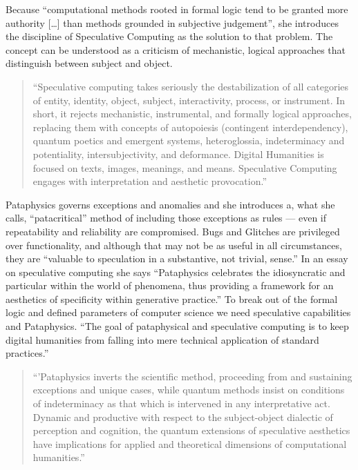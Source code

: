Because ``computational methods rooted in formal logic tend to be granted more authority […] than methods grounded in subjective judgement'', she introduces the discipline of Speculative Computing as the solution to that problem.  The concept can be understood as a criticism of mechanistic, logical approaches that distinguish between subject and object.

\begin{quotation}
  ``Speculative computing takes seriously the destabilization of all categories of entity, identity, object, subject, interactivity, process, or instrument. In short, it rejects mechanistic, instrumental, and formally logical approaches, replacing them with concepts of autopoiesis (contingent interdependency), quantum poetics and emergent systems, heteroglossia, indeterminacy and potentiality, intersubjectivity, and deformance. Digital Humanities is focused on texts, images, meanings, and means. Speculative Computing engages with interpretation and aesthetic provocation.'' 
\end{quotation}

Pataphysics governs exceptions and anomalies and she introduces a, what she calls, ``patacritical'' method of including those exceptions as rules --- even if repeatability and reliability are compromised. Bugs and Glitches are privileged over functionality, and although that may not be as useful in all circumstances, they are ``valuable to speculation in a substantive, not trivial, sense.'' In an essay on speculative computing \autocite{Drucker2007} she says ``Pataphysics celebrates the idiosyncratic and particular within the world of phenomena, thus providing a framework for an aesthetics of specificity within generative practice.'' To break out of the formal logic and defined parameters of computer science we need speculative capabilities and Pataphysics. ``The goal of pataphysical and speculative computing is to keep digital humanities from falling into mere technical application of standard practices.''

\begin{quotation}
  ``'Pataphysics inverts the scientific method, proceeding from and sustaining exceptions and unique cases, while quantum methods insist on conditions of indeterminacy as that which is intervened in any interpretative act. Dynamic and productive with respect to the subject-object dialectic of perception and cognition, the quantum extensions of speculative aesthetics have implications for applied and theoretical dimensions of computational humanities.'' %
\end{quotation}

